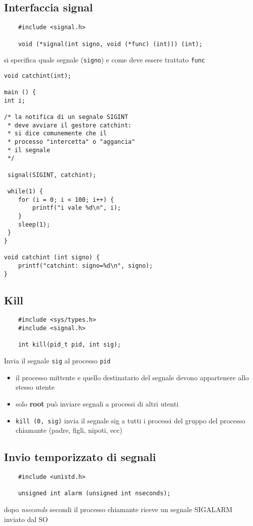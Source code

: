 \documentclass[italian,12pt,a4paper]{article}
\begin{document}
\subsection{Interfaccia signal}
\begin{verbatim}
	#include <signal.h>
	
	void (*signal(int signo, void (*func) (int))) (int);
\end{verbatim}
si specifica quale segnale (\verb|signo|) e come deve essere trattato \verb|func|
\begin{lstlisting}
void catchint(int);

main () {
int i;

/* la notifica di un segnale SIGINT
 * deve avviare il gestore catchint:
 * si dice comunemente che il
 * processo "intercetta" o "aggancia"
 * il segnale
 */
 
 signal(SIGINT, catchint);
 
 while(1) {
 	for (i = 0; i < 100; i++) {
 		printf("i vale %d\n", i);
 	}
 	sleep(1);
 }
}

void catchint (int signo) {
	printf("catchint: signo=%d\n", signo);
}
\end{lstlisting}
\subsection{Kill}
\begin{verbatim}
	#include <sys/types.h>
	#include <signal.h>
	
	int kill(pid_t pid, int sig);
\end{verbatim}
Invia il segnale \verb|sig| al processo \verb|pid|
\begin{itemize}
	\item il processo mittente e quello destinatario del segnale devono appartenere allo stesso utente
	\item solo \textbf{root} può inviare segnali a processi di altri utenti
	\item \verb|kill (0, sig)| invia il segnale sig a tutti i processi del gruppo del processo chiamante (padre, figli, nipoti, ecc)
\end{itemize}
\subsection{Invio temporizzato di segnali}
\begin{verbatim}
	#include <unistd.h>
	
	unsigned int alarm (unsigned int nseconds);
\end{verbatim}
dopo \textit{nseconds} secondi il processo chiamante riceve un segnale SIGALARM inviato dal SO
\end{document}
